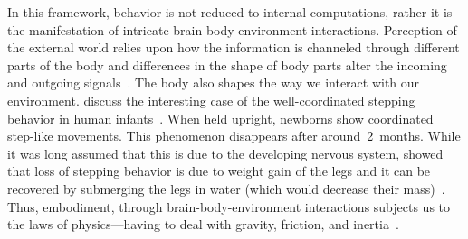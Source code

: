 In this framework, behavior is not reduced to internal computations, rather it is the manifestation of intricate brain-body-environment interactions.
Perception of the external world relies upon how the information is channeled through different parts of the body and differences in the shape of body parts alter the incoming and outgoing signals~\cite{Gomez2019Neuron}.
The body also shapes the way we interact with our environment.
 discuss the interesting case of the well-coordinated stepping behavior in human infants~\cite{Gomez2019Neuron}.
When held upright, newborns show coordinated step-like movements.
This phenomenon disappears after around~2~months.
While it was long assumed that this is due to the developing nervous system, \citeauthor{Thelen1984InfBeh} showed that loss of stepping behavior is due to weight gain of the legs and it can be recovered by submerging the legs in water (which would decrease their mass)~\cite{Thelen1984InfBeh}.
Thus, embodiment, through brain-body-environment interactions subjects us to the laws of physics---having to deal with gravity, friction, and inertia~\cite{Pfeifer2006Book}.


